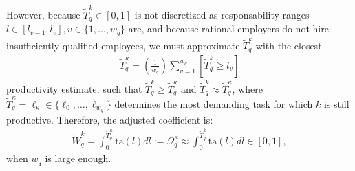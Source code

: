 \documentclass[hidelinks, nonatbib]{elsarticle}
\begin{document}
    However, because $\tilde{T}_{q}^{k} \in [0,1]$ is not discretized as responsability ranges $l \in [l_{v-1},l_{v}], v \in \{1, \dots, w_q\}$ are, and because rational employers do not hire insufficiently qualified employees, we must approximate $\tilde{T}_{q}^{k}$ with the closest 
    \begin{gather}
        \tilde{T}_{q}^{\kappa}
        =
        \left(
            \frac{1}{w_q}
        \right)
        \sum_{v=1}^{w_q}
        \left[
            \tilde{T}_{q}^{k}
            \geq
            l_v
        \right]
    \end{gather}
    productivity estimate, such that $\tilde{T}_{q}^{k} \geq \tilde{T}_{q}^{\kappa}$ and $\tilde{T}_{q}^{k} \approx \tilde{T}_{q}^{\kappa}$, where $
    \tilde{T}_{q}^{\kappa} = \ell_{\kappa} \in \{\ell_0, \dots, \ell_{w_q}\}$ determines the most demanding task for which $k$ is still productive. Therefore, the adjusted coefficient is:
    \begin{gather}
        \tilde{W}_{q}^{k}
        =
        \int_{0}^{\tilde{T}_{q}^{\kappa}}
        \text{ta}(l)
        dl
        :=
        \Omega_{q}^{\kappa}
        \approx
        \int_{0}^{\tilde{T}_{q}^{k}}
        \text{ta}(l)
        dl
        \in 
        [0,1]
        ,
    \end{gather}
    when $w_q$ is large enough.
\end{document}
